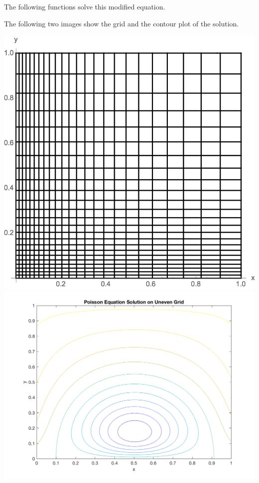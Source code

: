 \documentclass[11pt, oneside]{article}
\begin{document}
\begin{enumerate}
    The following functions solve this modified equation.
    
    
    The following two images show the grid and the contour plot of the solution.
    \begin{center}
      \includegraphics[scale=0.3]{Figures/05_06.png}
      \includegraphics[scale=0.5]{Figures/05_07.png}
    \end{center}


\end{enumerate}
\end{document}
